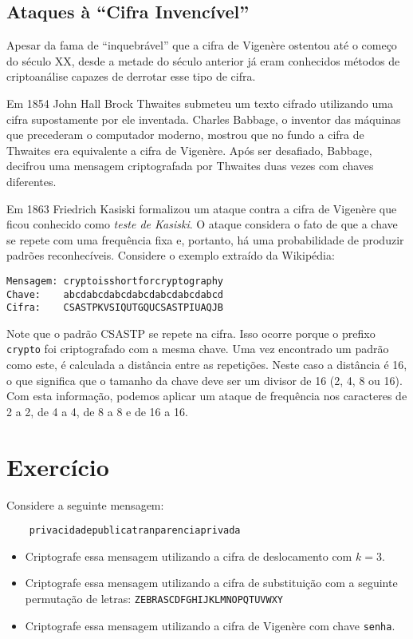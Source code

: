 \subsection{Ataques à ``Cifra Invencível''}
\label{sec:criptoanalise-vegenere}

Apesar da fama de ``inquebrável'' que a cifra de Vigenère ostentou até o começo do século XX, desde a metade do século anterior já eram conhecidos métodos de criptoanálise capazes de derrotar esse tipo de cifra.

Em 1854 John Hall Brock Thwaites submeteu um texto cifrado utilizando uma cifra supostamente por ele inventada.
Charles Babbage, o inventor das máquinas que precederam o computador moderno, mostrou que no fundo a cifra de Thwaites era equivalente a cifra de Vigenère.
Após ser desafiado, Babbage, decifrou uma mensagem criptografada por Thwaites duas vezes com chaves diferentes.

Em 1863 Friedrich Kasiski formalizou um ataque contra a cifra de Vigenère que ficou conhecido como {\em teste de Kasiski}.
O ataque considera o fato de que a chave se repete com uma frequência fixa e, portanto, há uma probabilidade de produzir padrões reconhecíveis.
Considere o exemplo extraído da Wikipédia:

\begin{example}
\begin{verbatim}
Mensagem: cryptoisshortforcryptography
Chave:    abcdabcdabcdabcdabcdabcdabcd
Cifra:    CSASTPKVSIQUTGQUCSASTPIUAQJB
\end{verbatim}
\end{example}

Note que o padrão CSASTP se repete na cifra.
Isso ocorre porque o prefixo {\tt crypto} foi criptografado com a mesma chave.
Uma vez encontrado um padrão como este, é calculada a distância entre as repetições.
Neste caso a distância é 16, o que significa que o tamanho da chave deve ser um divisor de 16 (2, 4, 8 ou 16).
Com esta informação, podemos aplicar um ataque de frequência nos caracteres de 2 a 2, de 4 a 4, de 8 a 8 e de 16 a 16.



\section{Exercício}
\label{sec:exercicio}

\begin{exercicio}
  Considere a seguinte mensagem:
  \begin{verbatim}
    privacidadepublicatranparenciaprivada
  \end{verbatim}
  \begin{itemize}
  \item Criptografe essa mensagem utilizando a cifra de deslocamento com $k = 3$.
  \item Criptografe essa mensagem utilizando a cifra de substituição com a seguinte permutação de letras: {\tt ZEBRASCDFGHIJKLMNOPQTUVWXY}
  \item Criptografe essa mensagem utilizando a cifra de Vigenère com chave {\tt senha}.
  \end{itemize}
\end{exercicio}

